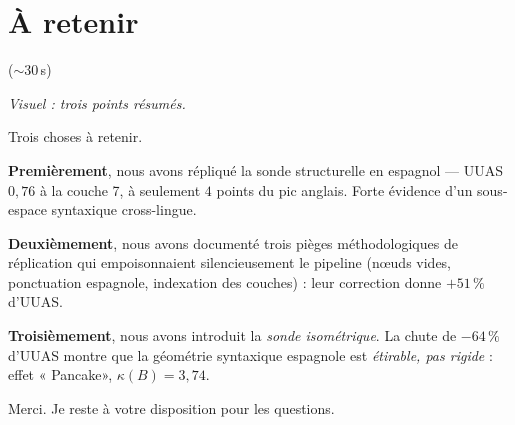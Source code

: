 \documentclass[11pt]{article}
\newcommand{\visuel}[1]{%
  {\footnotesize\color{midgray}\textit{Visuel : #1}\par\vspace{0.3em}}}
\newcommand{\duree}[1]{\hfill{\footnotesize\color{midgray}(${\sim}#1$\,s)}}
\begin{document}
\section{À retenir} \duree{30}
\visuel{trois points résumés.}

Trois choses à retenir.

\textbf{Premièrement}, nous avons répliqué la sonde structurelle
en espagnol --- UUAS $0{,}76$ à la couche 7, à seulement $4$ points
du pic anglais. Forte évidence d'un sous-espace syntaxique
cross-lingue.

\textbf{Deuxièmement}, nous avons documenté trois pièges
méthodologiques de réplication qui empoisonnaient silencieusement le
pipeline (n\oe{}uds vides, ponctuation espagnole, indexation des
couches) : leur correction donne $+51\,\%$ d'UUAS.

\textbf{Troisièmement}, nous avons introduit la \emph{sonde
isométrique}. La chute de $-64\,\%$ d'UUAS montre que la géométrie
syntaxique espagnole est \emph{étirable, pas rigide} : effet
« Pancake», $\kappa(B) = 3{,}74$.

\medskip

Merci. Je reste à votre disposition pour les questions.
\end{document}
